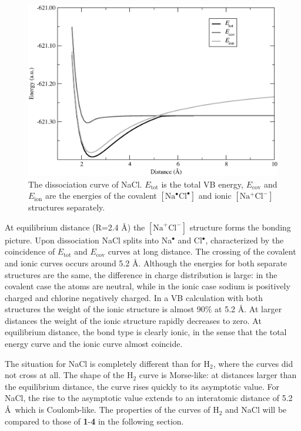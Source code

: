 \begin{figure}[ht]
\begin{center}
\includegraphics[scale=0.50]{dissociation/figures/nacl_g.eps}
\end{center}
\caption{The dissociation curve of NaCl. $E_\mathrm{tot}$ is the total VB energy, $E_\mathrm{cov}$  and $E_\mathrm{ion}$ are the energies of the covalent $[\mathrm{Na^\bullet Cl^\bullet}]$ and ionic $[\mathrm{Na^{+}Cl^{-}}]$ structures separately.}
\label{ch3.fig.nacl_c}
\end{figure}
At equilibrium distance (R=2.4 \AA) the $[\mathrm{Na}^{+}\mathrm{Cl}^{-}]$ structure forms the bonding picture. Upon dissociation NaCl splits into Na$^{\bullet}$ and Cl$^{\bullet}$, characterized by the coincidence of $E_\mathrm{tot}$ and $E_\mathrm{cov}$ curves at long distance.
The crossing of the covalent and ionic curves occurs around 5.2 \AA. Although the energies for both separate structures are the same, the difference in charge distribution is large: in the covalent case the atoms are neutral, while in the ionic case sodium is positively charged and chlorine negatively charged. In a VB calculation with both structures the weight of the ionic structure is almost 90\% at 5.2 \AA. At larger distances the weight of the ionic structure rapidly decreases to zero. At equilibrium distance, the bond type is clearly ionic, in the sense that the total energy curve and the ionic curve almost coincide.

The situation for NaCl is completely different than for H$_2$, where the curves did not cross at all. The shape of the H$_2$ curve is Morse-like: at distances larger than the equilibrium distance, the curve rises quickly to its asymptotic value. For NaCl, the rise to the asymptotic value extends to an interatomic distance of  5.2 \AA\, which is Coulomb-like. The properties of the curves of H$_2$ and NaCl will be compared to those of \textbf{1}-\textbf{4} in the following section.

